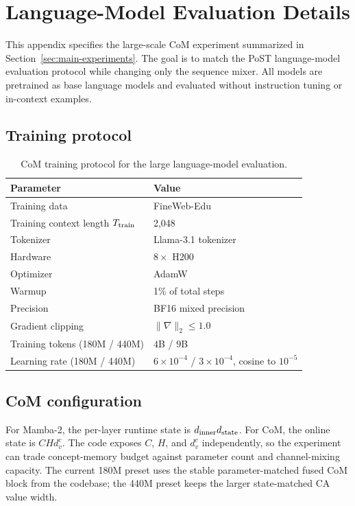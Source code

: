 \section{Language-Model Evaluation Details}
\label{app:lm-eval-details}

This appendix specifies the large-scale CoM experiment summarized in Section~\ref{sec:main-experiments}. The goal is to match the PoST language-model evaluation protocol while changing only the sequence mixer. All models are pretrained as base language models and evaluated without instruction tuning or in-context examples.

\subsection{Training protocol}

\begin{table}[ht]
\centering
\caption{CoM training protocol for the large language-model evaluation.}
\label{tab:com-train-config}
\small
\begin{tabular}{@{}ll@{}}
\toprule
\textbf{Parameter} & \textbf{Value} \\
\midrule
Training data & FineWeb-Edu~\citep{lozhkov2024fineweb} \\
Training context length $T_{\rm train}$ & 2,048 \\
Tokenizer & Llama-3.1 tokenizer~\citep{dubey2024llama} \\
Hardware & $8\times$ H200 \\
Optimizer & AdamW~\citep{loshchilov2019decoupled} \\
Warmup & 1\% of total steps \\
Precision & BF16 mixed precision \\
Gradient clipping & $\|\nabla\|_2 \le 1.0$ \\
Training tokens (180M / 440M) & $4$B / $9$B \\
Learning rate (180M / 440M) & $6\times10^{-4}$ / $3\times10^{-4}$, cosine to $10^{-5}$ \\
\bottomrule
\end{tabular}
\end{table}

\subsection{CoM configuration}

For Mamba-2, the per-layer runtime state is $d_{\rm inner}d_{\rm state}$. For CoM, the online state is $C H d_v^c$. The code exposes $C$, $H$, and $d_v^c$ independently, so the experiment can trade concept-memory budget against parameter count and channel-mixing capacity. The current 180M preset uses the stable parameter-matched fused CoM block from the codebase; the 440M preset keeps the larger state-matched CA value width.

